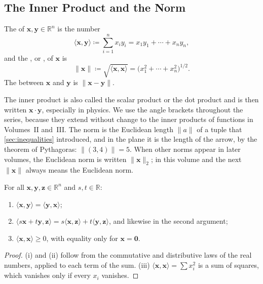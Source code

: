 \subsection{The Inner Product and the Norm}

\begin{definition}
\label{def:inner-product}
The  of $\mathbf x,\mathbf y\in\mathbb R^n$ is the number
\[
\langle\mathbf x,\mathbf y\rangle\coloneqq\sum_{i=1}^nx_iy_i=x_1y_1+\cdots+x_ny_n ,
\]
and the , or , of $\mathbf x$ is
\[
\|\mathbf x\|\coloneqq\sqrt{\langle\mathbf x,\mathbf x\rangle}=\bigl(x_1^2+\cdots+x_n^2\bigr)^{1/2}.
\]
The  between $\mathbf x$ and $\mathbf y$ is $\|\mathbf x-\mathbf y\|$.
\end{definition}

The inner product is also called the scalar product or the dot product and is then written $\mathbf x\cdot\mathbf y$, especially in physics. We use the angle brackets throughout the series, because they extend without change to the inner products of functions in Volumes~II and~III. The norm is the Euclidean length $\|a\|$ of a tuple that \cref{sec:inequalities} introduced, and in the plane it is the length of the arrow, by the theorem of Pythagoras: $\|(3,4)\|=5$. When other norms appear in later volumes, the Euclidean norm is written $\|\mathbf x\|_2$; in this volume and the next $\|\mathbf x\|$ always means the Euclidean norm.

\begin{proposition}
\label{prop:inner-product}
For all $\mathbf x,\mathbf y,\mathbf z\in\mathbb R^n$ and $s,t\in\mathbb R$:
\begin{enumerate}
\item $\langle\mathbf x,\mathbf y\rangle=\langle\mathbf y,\mathbf x\rangle$;
\item $\langle s\mathbf x+t\mathbf y,\mathbf z\rangle=s\langle\mathbf x,\mathbf z\rangle+t\langle\mathbf y,\mathbf z\rangle$, and likewise in the second argument;
\item $\langle\mathbf x,\mathbf x\rangle\ge0$, with equality only for $\mathbf x=\mathbf 0$.
\end{enumerate}
\end{proposition}

\begin{proof}
(i) and (ii) follow from the commutative and distributive laws of the real numbers, applied to each term of the sum. (iii) $\langle\mathbf x,\mathbf x\rangle=\sum x_i^2$ is a sum of squares, which vanishes only if every $x_i$ vanishes.
\end{proof}

